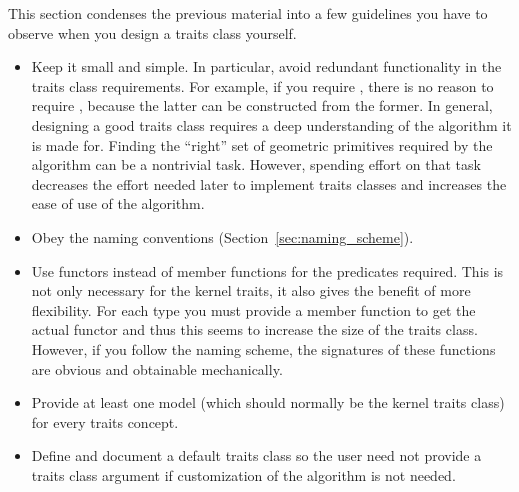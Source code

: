 This section condenses the previous material into a few guidelines you
have to observe when you design a traits class yourself.
\begin{itemize}
\item Keep it small and simple. In particular, avoid redundant functionality
      in the traits class requirements. For example, if you require 
      , there is no reason to require , 
      because the latter can be constructed from the former. In general, 
      designing a good traits class requires a deep understanding of the 
      algorithm it is made for. Finding the ``right'' set of geometric 
      primitives required by the algorithm can be a nontrivial task. 
      However, spending effort on that task decreases the effort needed 
      later to implement traits classes and increases the ease of use of 
      the algorithm. 

\item Obey the naming conventions (Section~\ref{sec:naming_scheme}).
  
\item Use functors instead of member functions for the predicates
  required. This is not only necessary for the kernel traits, it also
  gives the benefit of more flexibility. For each type you must
  provide a member function to get the actual functor and thus this
  seems to increase the size of the traits class.  However, if you
  follow the naming scheme, the signatures of these functions are
  obvious and obtainable mechanically.
  
\item Provide at least one model (which should normally be the kernel
  traits class) for every traits concept.
  
\item Define and document a default traits class so the user need not
  provide a traits class argument if customization of the algorithm is
  not needed.

\end{itemize} 



